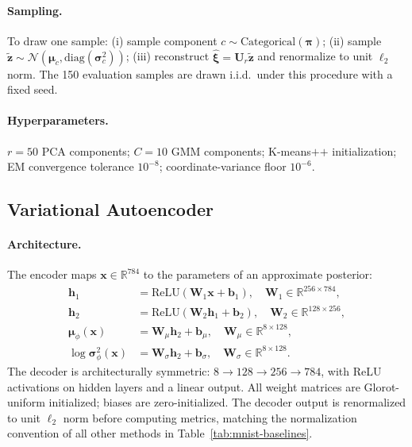 \paragraph{Sampling.}
To draw one sample: (i) sample component $c\sim\mathrm{Categorical}(\boldsymbol{\pi})$;
(ii) sample $\tilde{\mathbf{z}}\sim\mathcal{N}(\boldsymbol{\mu}_c,\mathrm{diag}(\boldsymbol{\sigma}_c^2))$;
(iii) reconstruct $\hat{\boldsymbol{\xi}}=\mathbf{U}_{r}\tilde{\mathbf{z}}$ and
renormalize to unit $\ell_2$ norm.
The 150 evaluation samples are drawn i.i.d.\ under this procedure with a fixed seed.

\paragraph{Hyperparameters.}
$r{=}50$ PCA components; $C{=}10$ GMM components; K-means$\texttt{++}$ initialization;
EM convergence tolerance $10^{-8}$; coordinate-variance floor $10^{-6}$.

\subsection{Variational Autoencoder}\label{app:vae}

\paragraph{Architecture.}
The encoder maps $\mathbf{x}\in\mathbb{R}^{784}$ to the parameters of an approximate posterior:
\begin{align}
  \mathbf{h}_1 &= \mathrm{ReLU}(\mathbf{W}_1\mathbf{x}+\mathbf{b}_1),\quad
    \mathbf{W}_1\in\mathbb{R}^{256\times 784}, \\
  \mathbf{h}_2 &= \mathrm{ReLU}(\mathbf{W}_2\mathbf{h}_1+\mathbf{b}_2),\quad
    \mathbf{W}_2\in\mathbb{R}^{128\times 256}, \\
  \boldsymbol{\mu}_\phi(\mathbf{x}) &= \mathbf{W}_\mu\mathbf{h}_2+\mathbf{b}_\mu,\quad
    \mathbf{W}_\mu\in\mathbb{R}^{8\times 128}, \\
  \log\boldsymbol{\sigma}^2_\phi(\mathbf{x}) &= \mathbf{W}_\sigma\mathbf{h}_2+\mathbf{b}_\sigma,\quad
    \mathbf{W}_\sigma\in\mathbb{R}^{8\times 128}.
\end{align}
The decoder is architecturally symmetric: $8\to128\to256\to784$, with ReLU activations on
hidden layers and a linear output.
All weight matrices are Glorot-uniform initialized; biases are zero-initialized.
The decoder output is renormalized to unit $\ell_2$ norm before computing metrics, matching
the normalization convention of all other methods in Table~\ref{tab:mnist-baselines}.

